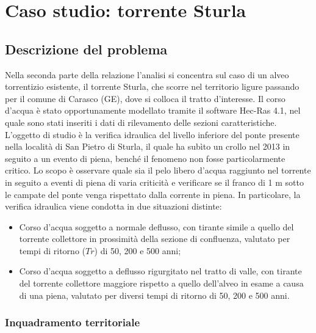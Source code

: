 \documentclass[12pt]{article} %
\begin{document}
\newpage

\section{Caso studio: torrente Sturla}
\subsection{Descrizione del problema}
\noindent Nella seconda parte della relazione l’analisi si concentra sul caso di un alveo torrentizio esistente, il torrente Sturla, che scorre nel territorio ligure passando per il comune di Carasco (GE), dove si colloca il tratto d’interesse. Il corso d’acqua è stato opportunamente modellato tramite il software Hec-Ras 4.1, nel quale sono stati inseriti i dati di rilevamento delle sezioni caratteristiche.
L’oggetto di studio è la verifica idraulica del livello inferiore del ponte presente nella località di San Pietro di Sturla, il quale ha subìto un crollo nel 2013 in seguito a un evento di piena, benché il fenomeno non fosse particolarmente critico. Lo scopo è osservare quale sia il pelo libero d’acqua raggiunto nel torrente in seguito a eventi di piena di varia criticità e verificare se il franco di 1 m sotto le campate del ponte venga rispettato dalla corrente in piena.
In particolare, la verifica idraulica viene condotta in due situazioni distinte:

\begin{itemize}
    \item Corso d'acqua soggetto a normale deflusso, con tirante simile a quello del torrente collettore in prossimità della sezione di confluenza, valutato per tempi di ritorno ($Tr$) di 50, 200 e 500 anni;
    \item Corso d'acqua soggetto a deflusso rigurgitato nel tratto di valle, con tirante del torrente collettore maggiore rispetto a quello dell'alveo in esame a causa di una piena, valutato per diversi tempi di ritorno di 50, 200 e 500 anni.
\end{itemize}

\subsubsection{Inquadramento territoriale}
\end{document}
